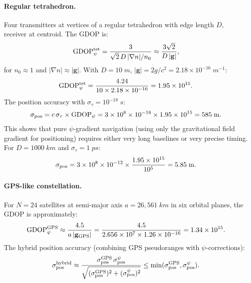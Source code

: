 \documentclass[aps,prd,twocolumn,superscriptaddress,nofootinbib,longbibliography]{revtex4-2}
\begin{document}
\paragraph{Regular tetrahedron.}
Four transmitters at vertices of a regular tetrahedron with edge length $D$,
receiver at centroid. The GDOP is:
\begin{equation}\label{eq:GDOP-tet}
\mathrm{GDOP}_\psi^{\rm tet} = \frac{3}{\sqrt{2}\,D\,|\nabla n|/n_0}
\approx \frac{3\sqrt{2}}{D\,|\mathbf{g}|},
\end{equation}
for $n_0 \approx 1$ and $|\nabla n| \approx |\mathbf{g}|$. With
$D = 10\;\si{m}$, $|\mathbf{g}| = 2g/c^2 = 2.18\times10^{-16}\;\si{m^{-1}}$:
\begin{equation}
\mathrm{GDOP}_\psi^{\rm tet} = \frac{4.24}{10\times2.18\times10^{-16}}
= 1.95\times10^{15}.
\end{equation}
The position accuracy with $\sigma_\tau = 10^{-18}\;\si{s}$:
\begin{equation}
\sigma_{\rm pos} = c\,\sigma_\tau\times\mathrm{GDOP}_\psi
= 3\times10^8\times10^{-18}\times1.95\times10^{15} = 585\;\si{m}.
\end{equation}
This shows that pure $\psi$-gradient navigation (using only the
gravitational field gradient for positioning) requires either very long
baselines or very precise timing. For $D = 1000\;\si{km}$ and
$\sigma_\tau = 1\;\si{ps}$:
\begin{equation}
\sigma_{\rm pos} = 3\times10^8\times10^{-12}\times\frac{1.95\times10^{15}}{10^5}
= 5.85\;\si{m}.
\end{equation}

\paragraph{GPS-like constellation.}
For $N = 24$ satellites at semi-major axis $a = 26{,}561\;\si{km}$ in
six orbital planes, the GDOP is approximately:
\begin{equation}\label{eq:GDOP-GPS}
\mathrm{GDOP}_\psi^{\rm GPS} \approx \frac{4.5}{a\,|\mathbf{g}_{\rm GPS}|}
= \frac{4.5}{2.656\times10^7\times1.26\times10^{-16}} = 1.34\times10^{15}.
\end{equation}
The hybrid position accuracy (combining GPS pseudoranges with $\psi$-corrections):
\begin{equation}
\sigma_{\rm pos}^{\rm hybrid} \approx \frac{\sigma_{\rm pos}^{\rm GPS}\,\sigma_{\rm pos}^{\psi}}
{\sqrt{(\sigma_{\rm pos}^{\rm GPS})^2 + (\sigma_{\rm pos}^{\psi})^2}}
\leq \min(\sigma_{\rm pos}^{\rm GPS}, \sigma_{\rm pos}^{\psi}).
\end{equation}
\end{document}

